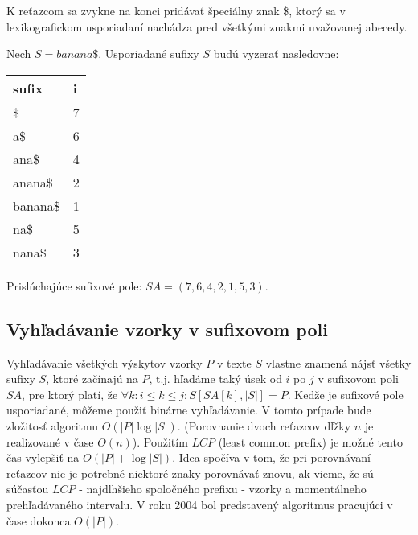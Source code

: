 K reťazcom sa zvykne na konci pridávať špeciálny znak \$, ktorý sa v
lexikografickom usporiadaní nachádza pred všetkými znakmi uvažovanej abecedy.

\begin{example}
    Nech $S = banana\$$. Usporiadané sufixy $S$ budú vyzerať nasledovne:
    \begin{center}
        \begin{tabular}{ | l | l | }
            \hline
            \textbf{sufix} & \textbf{i} \\ \hline
            \$             & 7          \\ \hline
            a\$            & 6          \\ \hline
            ana\$          & 4          \\ \hline
            anana\$        & 2          \\ \hline
            banana\$       & 1          \\ \hline
            na\$           & 5          \\ \hline
            nana\$         & 3          \\ \hline
        \end{tabular}
    \end{center}
    
    Prislúchajúce sufixové pole: $SA = (7, 6, 4, 2, 1, 5, 3)$.
\end{example}

    \subsection{Vyhľadávanie vzorky v sufixovom poli}
    Vyhľadávanie všetkých výskytov vzorky $P$ v texte $S$ vlastne znamená nájsť
    všetky sufixy $S$, ktoré začínajú na $P$, t.j. hľadáme taký úsek od $i$ po
    $j$ v sufixovom poli $SA$, pre ktorý platí, že
    $\forall k: i \leq k \leq j: S[SA[k], \lvert S \rvert] = P$. Kedže je
    sufixové pole usporiadané, môžeme použiť binárne vyhľadávanie. V tomto
    prípade bude zložitosť algoritmu $O(\lvert P \rvert \log \lvert S \rvert)$.
    (Porovnanie dvoch reťazcov dľžky $n$ je realizované v čase $O(n)$). Použitím
    $LCP$ (least common prefix) je možné tento čas vylepšiť na $O(\lvert P
    \rvert + \log{\lvert S \rvert})$. Idea spočíva v tom, že pri porovnávaní
    reťazcov nie je potrebné niektoré znaky porovnávať znovu, ak vieme, že sú
    súčasťou $LCP$ - najdlhšieho spoločného prefixu - vzorky a momentálneho
    prehľadávaného intervalu. V roku 2004 bol predstavený algoritmus
    \cite{AKO04} pracujúci v čase dokonca $O(\lvert P \rvert)$.
    
